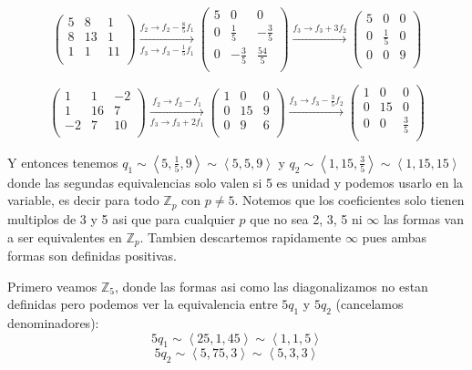 \documentclass[12pt]{amsart}
\newcommand{\ZZ}{\mathbb{Z}}
\newcommand{\lp}{\left(}
\newcommand{\rp}{\right)}
\newcommand{\lc}{\left<}
\newcommand{\rc}{\right>}
\theoremstyle{plain}
\begin{document}
$$
\lp\begin{matrix}
    5&8&1 \\
    8&13&1 \\
    1&1&11 \\
\end{matrix}\rp
\xrightarrow[f_3 \to f_3-\frac{1}{5}f_1]{f_2 \to f_2-
\frac{8}{5}f_1}
\lp\begin{matrix}
    5&0&0 \\
    0&\frac{1}{5}&-\frac{3}{5} \\
    0&-\frac{3}{5}&\frac{54}{5} \\
\end{matrix}\rp
\xrightarrow{f_3 \to f_3+3f_2}
\lp\begin{matrix}
    5&0&0 \\
    0&\frac{1}{5}&0 \\
    0&0&9 \\
\end{matrix}\rp
$$

$$
\lp\begin{matrix}
    1&1&-2 \\
    1&16&7 \\
    -2&7&10 \\
\end{matrix}\rp
\xrightarrow[f_3 \to f_3+2f_1]{f_2 \to f_2-f_1}
\lp\begin{matrix}
    1&0&0 \\
    0&15&9 \\
    0&9&6 \\
\end{matrix}\rp
\xrightarrow{f_3 \to f_3-\frac{3}{5}f_2}
\lp\begin{matrix}
    1&0&0 \\
    0&15&0 \\
    0&0&\frac{3}{5} \\
\end{matrix}\rp
$$

Y entonces tenemos $q_1 \sim \lc 5,\frac{1}{5},9\rc \sim
\lc 5,5,9\rc$ y $q_2 \sim \lc 1,15,\frac{3}{5}\rc\sim 
\lc 1,15,15\rc$ donde las segundas equivalencias solo valen
si 5 es unidad y podemos usarlo en la variable, es decir
para todo $\ZZ_p$ con $p\neq 5$. Notemos que los coeficientes 
solo tienen multiplos de 3 y 5 asi que para cualquier $p$ que
no sea 2, 3, 5 ni $\infty$ las formas van a ser equivalentes 
en $\ZZ_p$. Tambien descartemos rapidamente $\infty$ pues 
ambas formas son definidas positivas.

Primero veamos $\ZZ_5$, donde las formas asi como las 
diagonalizamos no estan definidas pero podemos ver la 
equivalencia entre $5q_1$ y $5q_2$ (cancelamos 
denominadores):
$$5q_1 \sim \lc 25,1,45\rc\sim\lc 1,1,5\rc$$
$$5q_2 \sim \lc 5,75,3\rc \sim\lc 5,3,3\rc$$
\end{document}
